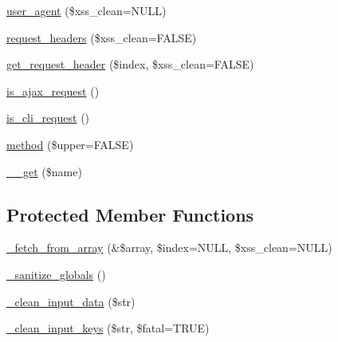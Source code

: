 \begin{DoxyCompactItemize}
\item 
\mbox{\hyperlink{class_c_i___input_a1ebccdad21d23b85966d2f5313135d10}{user\+\_\+agent}} (\$xss\+\_\+clean=N\+U\+LL)
\item 
\mbox{\hyperlink{class_c_i___input_a563e60708689cd1508df5ac1d2565d98}{request\+\_\+headers}} (\$xss\+\_\+clean=F\+A\+L\+SE)
\item 
\mbox{\hyperlink{class_c_i___input_a9e8f9c632cbf93fdb4d40d61575aa6e5}{get\+\_\+request\+\_\+header}} (\$index, \$xss\+\_\+clean=F\+A\+L\+SE)
\item 
\mbox{\hyperlink{class_c_i___input_a4c2e808b93a8ed814782278a24a1da38}{is\+\_\+ajax\+\_\+request}} ()
\item 
\mbox{\hyperlink{class_c_i___input_ac062ed0f4198fb4dd0946be2d2e3bb88}{is\+\_\+cli\+\_\+request}} ()
\item 
\mbox{\hyperlink{class_c_i___input_abcb24e05b69096ac7b7b6e00a5c0d713}{method}} (\$upper=F\+A\+L\+SE)
\item 
\mbox{\hyperlink{class_c_i___input_a17440316cc4bfe2790979c6f5c87f97e}{\+\_\+\+\_\+get}} (\$name)
\end{DoxyCompactItemize}
\subsection*{Protected Member Functions}
\begin{DoxyCompactItemize}
\item 
\mbox{\hyperlink{class_c_i___input_af6912411408e751fe9b9436b1d3e1958}{\+\_\+fetch\+\_\+from\+\_\+array}} (\&\$array, \$index=N\+U\+LL, \$xss\+\_\+clean=N\+U\+LL)
\item 
\mbox{\hyperlink{class_c_i___input_a4e3a3f9db60f04d2576be4018f18b366}{\+\_\+sanitize\+\_\+globals}} ()
\item 
\mbox{\hyperlink{class_c_i___input_afe5d3f26bbdb3239c38a00577ff435c1}{\+\_\+clean\+\_\+input\+\_\+data}} (\$str)
\item 
\mbox{\hyperlink{class_c_i___input_a845149c18f59609a4b338ec6700c3b0d}{\+\_\+clean\+\_\+input\+\_\+keys}} (\$str, \$fatal=T\+R\+UE)
\end{DoxyCompactItemize}
